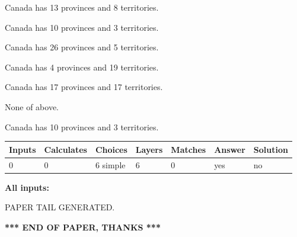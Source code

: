 \documentclass[12pt]{article}
\begin{document}
 
Canada has  13 provinces and  8 territories.
 
 
Canada has 10  provinces and 3 territories.
 
 
Canada has  26 provinces and  5 territories.
 
 
Canada has   4 provinces and  19 territories.
 
 
Canada has  17 provinces and  17 territories.
 
 
 None of above.
 
 
\noindent{}
 
 
Canada has 10  provinces and 3 territories.
 
 
\noindent{}
 
 
   
   
   
   
\noindent\begin{tabular}{|l|l|l|l|l|l|l|}
 \hline
Inputs & Calculates & Choices & Layers & Matches & Answer & Solution \\ \hline
 0  & 
 0  & 
 6
  simple  
  & 
 6  & 
 0  & 
  yes & 
  no 
  \\ \hline
 \end{tabular}
   
   
   
   
\noindent{}
   
   
   
   
\noindent\vspace{0.1in}\hspace{-0.08in} {\textbf{\Large{All inputs: }}}
   
   
   
   
   
   
 \vspace{0.2in}
 
   
   
\vspace{2.0in} PAPER TAIL GENERATED.
   
   
   
   
\vspace{1.0in} 
{\textbf{\large{ *** END OF PAPER, THANKS *** }}} 
   
\end{document}
